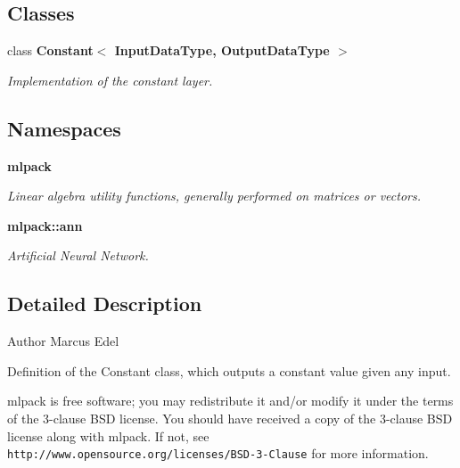 \subsection*{Classes}
\begin{DoxyCompactItemize}
\item 
class \textbf{ Constant$<$ Input\+Data\+Type, Output\+Data\+Type $>$}
\begin{DoxyCompactList}\small\item\em Implementation of the constant layer. \end{DoxyCompactList}\end{DoxyCompactItemize}
\subsection*{Namespaces}
\begin{DoxyCompactItemize}
\item 
 \textbf{ mlpack}
\begin{DoxyCompactList}\small\item\em Linear algebra utility functions, generally performed on matrices or vectors. \end{DoxyCompactList}\item 
 \textbf{ mlpack\+::ann}
\begin{DoxyCompactList}\small\item\em Artificial Neural Network. \end{DoxyCompactList}\end{DoxyCompactItemize}


\subsection{Detailed Description}
\begin{DoxyAuthor}{Author}
Marcus Edel
\end{DoxyAuthor}
Definition of the Constant class, which outputs a constant value given any input.

mlpack is free software; you may redistribute it and/or modify it under the terms of the 3-\/clause B\+SD license. You should have received a copy of the 3-\/clause B\+SD license along with mlpack. If not, see {\tt http\+://www.\+opensource.\+org/licenses/\+B\+S\+D-\/3-\/\+Clause} for more information. 